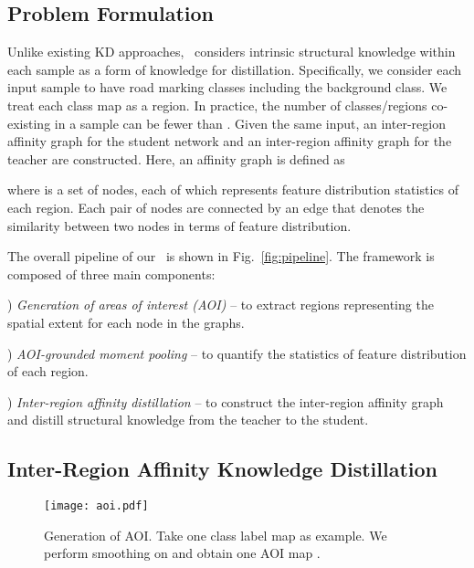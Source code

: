 \documentclass[10pt,twocolumn,letterpaper]{article}
\begin{document}
\subsection{Problem Formulation}
 
Unlike existing KD approaches, \algorithmname~considers intrinsic structural knowledge within each sample as a form of knowledge for distillation.
Specifically, we consider each input sample to have  road marking classes including the background class. We treat each class map as a region. In practice, the number of classes/regions co-existing in a sample can be fewer than .
Given the same input, an inter-region affinity graph  for the student network and an inter-region affinity graph  for the teacher are constructed. Here, an affinity graph is defined as 

where  is a set of nodes, each of which represents feature distribution statistics of each region. Each pair of nodes are connected by an edge  that denotes the similarity between two nodes in terms of feature distribution.

The overall pipeline of our \algorithmname~is shown in Fig.~\ref{fig:pipeline}.
The framework is composed of three main components: 

) \textit{Generation of areas of interest (AOI)} -- to extract regions representing the spatial extent for each node in the graphs.

) \textit{AOI-grounded moment pooling} -- to quantify the statistics of feature distribution of each region. 

) \textit{Inter-region affinity distillation} -- to construct the inter-region affinity graph and distill structural knowledge from the teacher to the student.







\subsection{Inter-Region Affinity Knowledge Distillation}




\begin{figure}[t]
  \centering
  \texttt{[image: aoi.pdf]}
  \caption{Generation of AOI. Take one class label map  as example. We perform smoothing on  and obtain one AOI map .}
  \centering
  \vskip -0.4cm
  \label{fig:aoi}
\end{figure}
\end{document}
